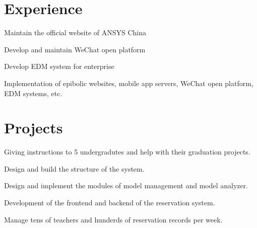 \documentclass[]{resume_en}
\begin{document}
\hfill
\begin{minipage}[t]{0.66\textwidth} 


\section{Experience}
\vspace{\topsep}
\begin{tightemize}
\item Maintain the official website of ANSYS China
\item Develop and maintain WeChat open platform
\item Develop EDM system for enterprise
\end{tightemize}
\sectionsep

\begin{tightemize}
\item Implementation of epibolic websites, mobile app servers, WeChat open platform, EDM systems, etc.
\end{tightemize}


\section{Projects}
\begin{tightemize}
\item Giving instructions to 5 undergradutes and help with their graduation projects.
\item Design and build the structure of the system.
\item Design and implement the modules of model management and model analyzer.
\end{tightemize}
\sectionsep

\begin{tightemize}
\item Development of the frontend and backend of the reservation system.
\item Manage tens of teachers and hunderds of reservation records per week.
\end{tightemize}
\sectionsep


\end{minipage}
\end{document}
